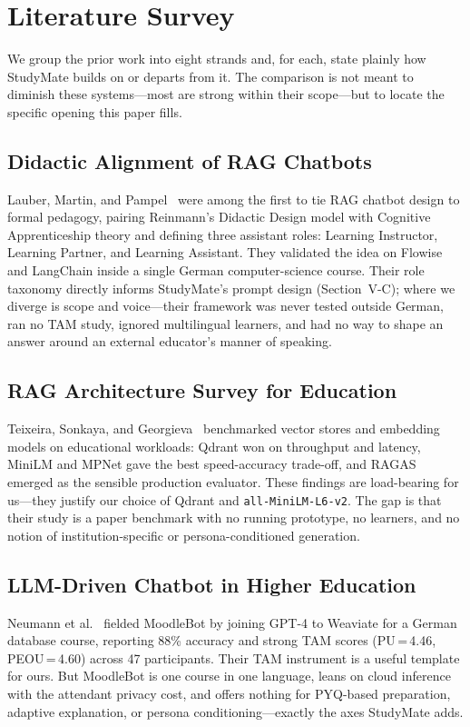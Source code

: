 \documentclass[conference]{IEEEtran}
\begin{document}
\section{Literature Survey}
We group the prior work into eight strands and, for each, state plainly
how StudyMate builds on or departs from it. The comparison is not meant
to diminish these systems---most are strong within their scope---but to
locate the specific opening this paper fills.

\subsection{Didactic Alignment of RAG Chatbots}
Lauber, Martin, and Pampel~\cite{lauber2025} were among the first to
tie RAG chatbot design to formal pedagogy, pairing Reinmann's Didactic
Design model with Cognitive Apprenticeship theory and defining three
assistant roles: Learning Instructor, Learning Partner, and Learning
Assistant. They validated the idea on Flowise and LangChain inside a
single German computer-science course. Their role taxonomy directly
informs StudyMate's prompt design (Section~V-C); where we diverge is
scope and voice---their framework was never tested outside German, ran
no TAM study, ignored multilingual learners, and had no way to shape
an answer around an external educator's manner of speaking.

\subsection{RAG Architecture Survey for Education}
Teixeira, Sonkaya, and Georgieva~\cite{teixeira2025} benchmarked vector
stores and embedding models on educational workloads: Qdrant won on
throughput and latency, MiniLM and MPNet gave the best speed-accuracy
trade-off, and RAGAS emerged as the sensible production evaluator.
These findings are load-bearing for us---they justify our choice of
Qdrant and \texttt{all-MiniLM-L6-v2}. The gap is that their study is a
paper benchmark with no running prototype, no learners, and no notion
of institution-specific or persona-conditioned generation.

\subsection{LLM-Driven Chatbot in Higher Education}
Neumann et al.~\cite{neumann2025} fielded MoodleBot by joining GPT-4 to
Weaviate for a German database course, reporting 88\% accuracy and
strong TAM scores (PU\,=\,4.46, PEOU\,=\,4.60) across 47 participants.
Their TAM instrument is a useful template for ours. But MoodleBot is
one course in one language, leans on cloud inference with the attendant
privacy cost, and offers nothing for PYQ-based preparation, adaptive
explanation, or persona conditioning---exactly the axes StudyMate adds.
\end{document}
